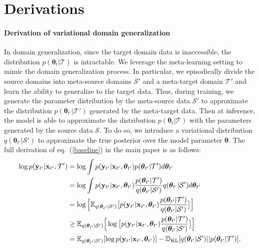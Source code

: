 \documentclass{article} \usepackage[table]{xcolor}
\newcommand{\x}{\mathbf{x}}
\newcommand{\y}{\mathbf{y}}
\newcommand{\dkl}{\mathbb{D}_{\rm{KL}}}
\newcommand{\btheta}{\boldsymbol{\theta}}
\begin{document}





\newpage
\appendix

\section{Derivations}
\label{app1}

\paragraph{Derivation of variational domain generalization} 
In domain generalization, since the target domain data is inaccessible, the distribution $p(\btheta_{t}|\mathcal{T})$ is intractable.
We leverage the meta-learning setting to mimic the domain generalization process. In particular, we episodically divide the source domains into meta-source domains $\mathcal{S'}$ and a meta-target domain $\mathcal{T'}$ and learn the ability to generalize to the target data.
Thus, during training, we generate the parameter distribution by the meta-source data $\mathcal{S'}$ to approximate the distribution $p(\btheta_{t'}|\mathcal{T'})$ generated by the meta-target data.
Then at inference, the model is able to approximate the distribution $p(\btheta_{t}|\mathcal{T})$ with the parameters generated by the source data $\mathcal{S}$.
To do so, we introduce  a variational distribution $q(\btheta_{t'}|\mathcal{S'})$ to approximate the true posterior over the model parameter $\btheta$. The full derivation of eq.~(\ref{baseline}) in the main paper is as follows:
\begin{equation}
\begin{aligned}
\label{supbase}
    \log p(\y_{t'}|\x_{t'}, \mathcal{T'}) & = \log \int p(\y_{t'}|\x_{t'}, \btheta_{t'})p(\btheta_{t'}|\mathcal{T'})d\btheta_{t'} \\
    & = \log \int p(\y_{t'}|\x_{t'}, \btheta_{t'}) \frac{p(\btheta_{t'}|\mathcal{T'})}{q(\btheta_{t'}|\mathcal{S'})} q(\btheta_{t'}|\mathcal{S'}) d\btheta_{t'}
    \\
    & = \log \Big[ \mathbb{E}_{q(\btheta_{t'}|\mathcal{S'})} \big[ p(\y_{t'}|\x_{t'}, \btheta_{t'}) \frac{p(\btheta_{t'}|\mathcal{T'})}{q(\btheta_{t'}|\mathcal{S'})} \big] \Big]\\
    & \geq \mathbb{E}_{q(\btheta_{t'}|\mathcal{S'})} \Big[ \log \big[ p(\y_{t'}|\x_{t'}, \btheta_{t'}) \frac{p(\btheta_{t'}|\mathcal{T'})}{q(\btheta_{t'}|\mathcal{S'})} \big] \Big] \\
    & = \mathbb{E}_{q(\btheta_{t'}|\mathcal{S'})}[\log p(\y_{t'}|\x_{t'}, \btheta_{t'})] - \dkl [q(\btheta_{t'}|\mathcal{S'}) || p(\btheta_{t'}|\mathcal{T'})].
\end{aligned}
\end{equation}
\end{document}
